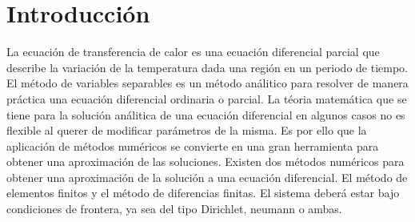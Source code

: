 \section{Introducción}

La ecuación de transferencia de calor es una ecuación diferencial parcial que describe la variación de la temperatura dada una región en un periodo de tiempo. El método de variables separables es un método análitico para resolver de manera práctica una ecuación diferencial ordinaria o parcial. La téoria matemática que se tiene para la solución análitica de una ecuación diferencial en algunos casos no es flexible al querer de modificar parámetros de la misma. Es por ello que la aplicación de métodos numéricos se convierte en una gran herramienta para obtener una aproximación de las soluciones\cite{chavarria_2019}. Existen dos métodos numéricos para obtener una aproximación de la solución a una ecuación diferencial. El método de elementos finitos y el método de diferencias finitas\cite{quintana_2016}. El sistema deberá estar bajo condiciones de frontera, ya sea del tipo Dirichlet, neumann o ambas.